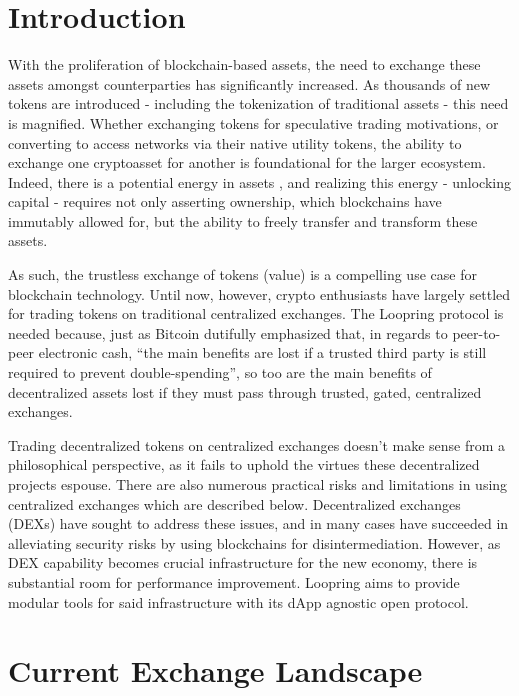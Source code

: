 \documentclass[UTF8,nofonts]{article}
\begin{document}
\begin{multicols}{2}
\section{Introduction\label{sec:introduction}}

With the proliferation of blockchain-based assets, the need to exchange these assets amongst counterparties has significantly increased. As thousands of new tokens are introduced - including the tokenization of traditional assets - this need is magnified. Whether exchanging tokens for speculative trading motivations, or converting to access networks via their native utility tokens, the ability to exchange one cryptoasset for another is foundational for the larger ecosystem. Indeed, there is a potential energy in assets \cite{desotocapital}, and realizing this energy - unlocking capital - requires not only asserting ownership, which blockchains have immutably allowed for, but the ability to freely transfer and transform these assets.
 
As such, the trustless exchange of tokens (value) is a compelling use case for blockchain technology. Until now, however, crypto enthusiasts have largely settled for trading tokens on traditional centralized exchanges. The Loopring protocol is needed because, just as Bitcoin \cite{nakamoto2008bitcoin} dutifully emphasized that, in regards to peer-to-peer electronic cash, \enquote{the main benefits are lost if a trusted third party is still required to prevent double-spending}, so too are the main benefits of decentralized assets lost if they must pass through trusted, gated, centralized exchanges.

Trading decentralized tokens on centralized exchanges doesn't make sense from a philosophical perspective, as it fails to uphold the virtues these decentralized projects espouse. There are also numerous practical risks and limitations in using centralized exchanges which are described below. Decentralized exchanges (DEXs) \cite{schuh2015bitshares} \cite{bancor} \cite{kyber} have sought to address these issues, and in many cases have succeeded in alleviating security risks by using blockchains for disintermediation. However, as DEX capability becomes crucial infrastructure for the new economy, there is substantial room for performance improvement. Loopring aims to provide modular tools for said infrastructure with its dApp agnostic open protocol.

\section{Current Exchange Landscape\label{sec:current_exchange_landscape}}


\end{multicols}
\end{document}
